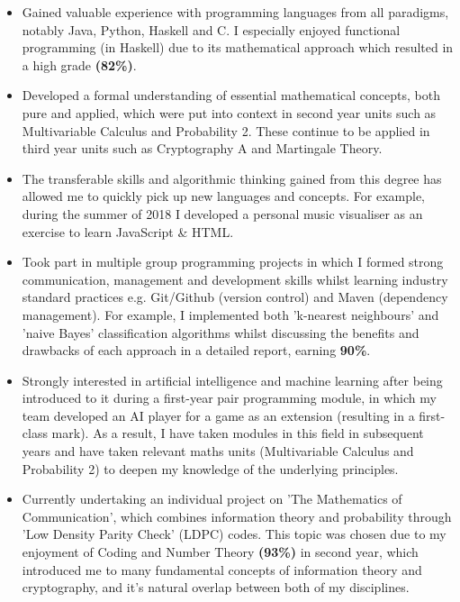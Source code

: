 \documentclass{cvclass}
\begin{document}
\begin{itemize}
  \item Gained valuable experience with programming languages from all paradigms, notably Java, Python, Haskell and C. I especially enjoyed functional programming (in Haskell) due to its mathematical approach which resulted in a high grade \textbf{(82\%)}.
  \item Developed a formal understanding of essential mathematical concepts, both pure and applied, which were put into context in second year units such as Multivariable Calculus and Probability 2. These continue to be applied in third year units such as Cryptography A and Martingale Theory.
  \item The transferable skills and algorithmic thinking gained from this degree has allowed me to quickly pick up new languages and concepts. For example, during the summer of 2018 I developed a personal music visualiser as an exercise to learn JavaScript \& HTML.
  \item Took part in multiple group programming projects in which I formed strong communication, management and development skills whilst learning industry standard practices e.g. Git/Github (version control) and Maven (dependency management). For example, I implemented both 'k-nearest neighbours' and 'naive Bayes' classification algorithms whilst discussing the benefits and drawbacks of each approach in a detailed report, earning \textbf{90\%}.
  
  \item Strongly interested in artificial intelligence and machine learning after being introduced to it during a first-year pair programming module, in which my team developed an AI player for a game as an extension (resulting in a first-class mark). As a result, I have taken modules in this field in subsequent years and have taken relevant maths units (Multivariable Calculus and Probability 2) to deepen my knowledge of the underlying principles.
 \item Currently undertaking an individual project on 'The Mathematics of Communication', which combines information theory and probability through 'Low Density Parity Check' (LDPC) codes.  This topic was chosen due to my enjoyment of Coding and Number Theory \textbf{(93\%)} in second year, which introduced me to many fundamental concepts of information theory and cryptography, and it's natural overlap between both of my disciplines.

\end{itemize}
\newline
{}\newline
{}\newline
{}\newline
\end{document}
